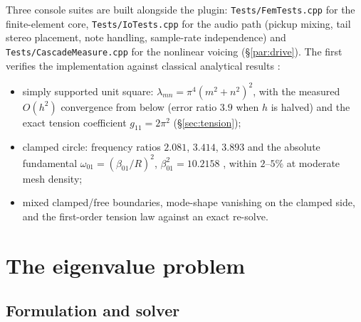\documentclass[11pt,a4paper]{article}
\newcommand{\code}[1]{\texttt{#1}}
\begin{document}
Three console suites are built alongside the plugin:
\code{Tests/FemTests.cpp} for the finite-element core,
\code{Tests/IoTests.cpp} for the audio path (pickup mixing, tail stereo
placement, note handling, sample-rate independence) and
\code{Tests/CascadeMeasure.cpp} for the nonlinear voicing
(\S\ref{par:drive}). The first verifies the implementation against
classical analytical results \cite{leissa}:
%
\begin{itemize}
\item simply supported unit square: $\lambda_{mn} = \pi^4 (m^2+n^2)^2$,
  with the measured $O(h^2)$ convergence from below (error ratio $3.9$ when
  $h$ is halved) and the exact tension coefficient
  $g_{11} = 2\pi^2$ (\S\ref{sec:tension});
\item clamped circle: frequency ratios $2.081$, $3.414$, $3.893$ and the
  absolute fundamental $\omega_{01} = (\beta_{01}/R)^2$,
  $\beta_{01}^2 = 10.2158$ \cite{leissa}, within $2$--$5\%$ at moderate
  mesh density;
\item mixed clamped/free boundaries, mode-shape vanishing on the clamped
  side, and the first-order tension law against an exact re-solve.
\end{itemize}

\section{The eigenvalue problem}
\label{sec:eig}

\subsection{Formulation and solver}
\end{document}
